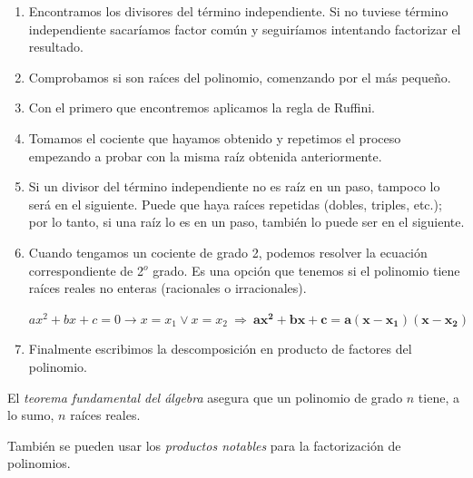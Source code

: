\begin{enumerate}
\vspace{-2mm}\item Encontramos los divisores del término independiente. Si no tuviese término independiente sacaríamos factor común y seguiríamos intentando factorizar el resultado.

\vspace{-2mm}\item Comprobamos si son raíces del polinomio, comenzando
por el más pequeño.

\vspace{-2mm}\item Con el primero que encontremos aplicamos la regla de
Ruffini.

\vspace{-2mm}\item Tomamos el cociente que hayamos obtenido y
repetimos el proceso empezando a probar con la misma
raíz obtenida anteriormente.

\vspace{-2mm}\item Si un divisor del término independiente no es raíz en un
paso, tampoco lo será en el siguiente. Puede que haya raíces repetidas (dobles, triples, etc.); por lo tanto, si una raíz lo es en un paso, también lo puede ser en el siguiente.

\vspace{-2mm}\item Cuando tengamos un cociente de grado 2, podemos resolver la ecuación correspondiente de 2$^o$ grado. Es una opción que tenemos si el polinomio tiene raíces reales no enteras (racionales o irracionales). 

$ax^2+bx+c=0 \to x=x_1 \vee x=x_2 \ \Rightarrow \ \boldsymbol{ax^2+bx+c=a(x-x_1)(x-x_2)}$

\vspace{-2mm}\item Finalmente escribimos la descomposición en producto de factores del polinomio.
\end{enumerate}
El \emph{teorema fundamental del álgebra} asegura que un polinomio de grado $n$ tiene, a lo sumo, $n$ raíces reales.

También se pueden usar los \emph{productos notables} para la factorización de polinomios.

